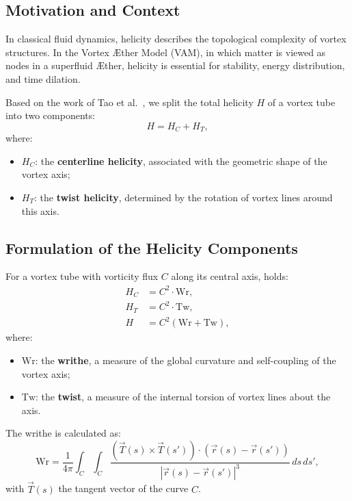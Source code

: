 \documentclass[preprint]{revtex4-2}
\begin{document}
\subsection{Motivation and Context}

In classical fluid dynamics, helicity describes the topological complexity of vortex structures. In the Vortex Æther Model (VAM), in which matter is viewed as nodes in a superfluid Æther, helicity is essential for stability, energy distribution, and time dilation.

Based on the work of Tao et al.~\cite{Tao2021}, we split the total helicity $H$ of a vortex tube into two components:
\begin{equation}
    H = H_C + H_T,
\end{equation}
where:
\begin{itemize}
    \item $H_C$: the \textbf{centerline helicity}, associated with the geometric shape of the vortex axis;
    \item $H_T$: the \textbf{twist helicity}, determined by the rotation of vortex lines around this axis.
\end{itemize}

\subsection{Formulation of the Helicity Components}

For a vortex tube with vorticity flux $C$ along its central axis, holds:
\begin{align}
    H_C &= C^2 \cdot \text{Wr}, \\
    H_T &= C^2 \cdot \text{Tw}, \\
    H &= C^2 (\text{Wr} + \text{Tw}),
\end{align}
where:
\begin{itemize}
    \item $\text{Wr}$: the \textbf{writhe}, a measure of the global curvature and self-coupling of the vortex axis;
    \item $\text{Tw}$: the \textbf{twist}, a measure of the internal torsion of vortex lines about the axis.
\end{itemize}

The writhe is calculated as:
\begin{equation}
    \text{Wr} = \frac{1}{4\pi} \int_C \int_C \frac{\left(\vec{T}(s) \times \vec{T}(s')\right) \cdot \left(\vec{r}(s) - \vec{r}(s')\right)}{|\vec{r}(s) - \vec{r}(s')|^3} \, ds \, ds',
\end{equation}
with $\vec{T}(s)$ the tangent vector of the curve $C$.
\end{document}
